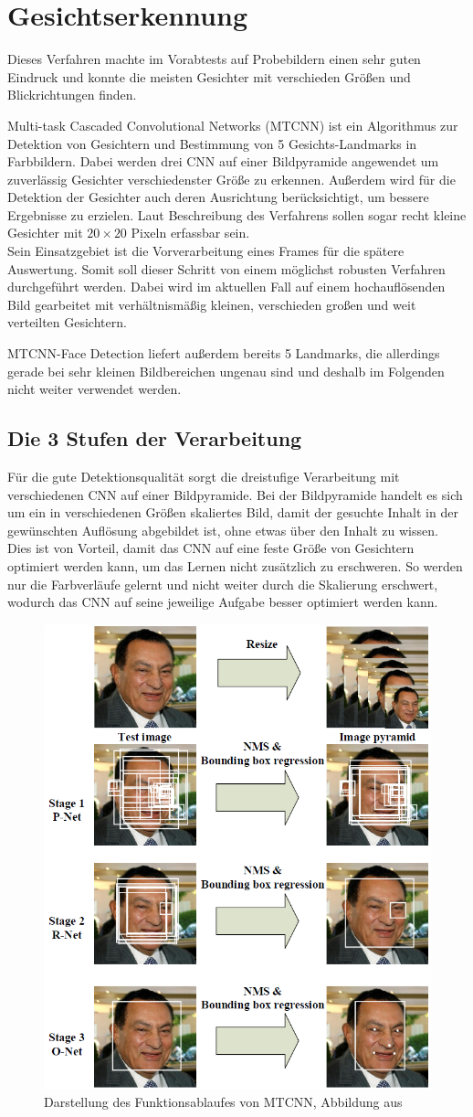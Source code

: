 \section{Gesichtserkennung}
\label{MTCNN}
Dieses Verfahren machte im Vorabtests auf Probebildern einen sehr guten Eindruck und konnte die meisten Gesichter mit verschieden Größen und Blickrichtungen finden.

Multi-task Cascaded Convolutional Networks (MTCNN) ist ein Algorithmus zur Detektion von Gesichtern und Bestimmung von 5 Gesichts-Landmarks in Farbbildern. Dabei werden drei CNN auf einer Bildpyramide angewendet um zuverlässig Gesichter verschiedenster Größe zu erkennen. Außerdem wird für die Detektion der Gesichter auch deren Ausrichtung berücksichtigt, um bessere Ergebnisse zu erzielen. Laut Beschreibung des Verfahrens sollen sogar recht kleine Gesichter mit $20\times 20$ Pixeln erfassbar sein.\\
Sein Einsatzgebiet ist die Vorverarbeitung eines Frames für die spätere Auswertung. Somit soll dieser Schritt von einem möglichst robusten Verfahren durchgeführt werden. Dabei wird im aktuellen Fall auf einem hochauflösenden Bild gearbeitet mit verhältnismäßig kleinen, verschieden großen und weit verteilten Gesichtern.

MTCNN-Face Detection liefert außerdem bereits 5 Landmarks, die allerdings gerade bei sehr kleinen Bildbereichen ungenau sind und deshalb im Folgenden nicht weiter verwendet werden.
\subsection{Die 3 Stufen der Verarbeitung}
Für die gute Detektionsqualität sorgt die dreistufige Verarbeitung mit verschiedenen CNN auf einer Bildpyramide. Bei der Bildpyramide handelt es sich um ein in verschiedenen Größen skaliertes Bild, damit der gesuchte Inhalt in der gewünschten Auflösung abgebildet ist, ohne etwas über den Inhalt zu wissen.\\
Dies ist von Vorteil, damit das CNN auf eine feste Größe von Gesichtern optimiert werden kann, um das Lernen nicht zusätzlich zu erschweren. So werden nur die Farbverläufe gelernt und nicht weiter durch die Skalierung erschwert, wodurch das CNN auf seine jeweilige Aufgabe besser optimiert werden kann.
\begin{figure}
	\centering
	\includegraphics[width=0.5\linewidth]{img/MTCNN_Step}
	\caption{Darstellung des Funktionsablaufes von MTCNN, Abbildung aus \cite{MTCCN}}
	\label{img_MTCNN_Step}
\end{figure}

